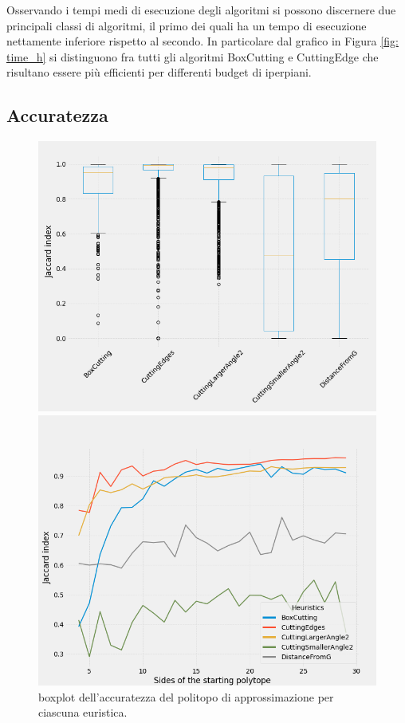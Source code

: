 Osservando i tempi medi di esecuzione degli algoritmi si possono discernere due principali
classi di algoritmi, il primo dei quali ha un tempo di esecuzione nettamente inferiore rispetto al secondo.
In particolare dal grafico in Figura \ref*{fig: time_h} si distinguono fra tutti gli algoritmi BoxCutting e CuttingEdge 
che risultano essere più efficienti per differenti budget di iperpiani.

\subsection*{Accuratezza}

\begin{figure}[H]
    \centering
    \begin{minipage}[b]{0.45\textwidth}
        \centering
        \includegraphics[width=\textwidth]{media/report/bxplt_jaccard.png}
        \caption{boxplot dell'accuratezza del politopo di approssimazione per ciascuna euristica.}
    \end{minipage}
    \hspace{0.05\textwidth}  
    \begin{minipage}[b]{0.45\textwidth}
        \centering
        \includegraphics[width=\textwidth]{media/report/Accuracy_plot.png}

\end{minipage}
\end{figure}
